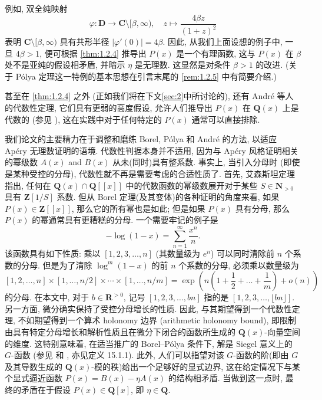 例如, 双全纯映射
\[ \varphi: \mathbf{D} \to \mathbf{C} \setminus [\beta, \infty), \quad z \mapsto \frac{4\beta z}{(1+z)^2} \]
表明 $\mathbf{C} \setminus [\beta, \infty)$ 具有共形半径 $|\varphi'(0)| = 4\beta$.
因此, 从我们上面设想的例子中, 一旦 $4\beta > 1$, 
便可根据 \autoref{thm:1.2.4} 推导出 $P(x)$ 是一个有理函数, 
这与 $P(x)$ 在 $\beta$ 处不是亚纯的假设相矛盾, 并暗示 $\eta$ 是无理数.
这显然是对条件 $\beta > 1$ 的改进.
(关于 P{\'o}lya 定理这一特例的基本思想在引言末尾的 \autoref{rem:1.2.5} 中有简要介绍.)

甚至在 \autoref{thm:1.2.4} 之外 (正如我们将在下文\autoref{sec:2}中所讨论的), 
还有 Andr{\'e} 等人的代数性定理, 它们具有更弱的高度假设, 
允许人们推导出 $P(x)$ 在 $\mathbf{Q}(x)$ 上是代数的 (参见 \cite{And04}\cite{And89}\cite{CDT21}), 
这在实践中对于任何特定的 $P(x)$ 通常可以直接排除.

我们论文的主要精力在于调整和磨练 Borel, P{\'o}lya 和 Andr{\'e} 的方法, 以适应 Ap{\'e}ry 无理数证明的语境.
代数性判据本身并不适用, 
因为与 Ap{\'e}ry 风格证明相关的幂级数 $A(x)$ and $B(x)$ 从未(同时)具有整系数.
事实上, 当引入分母时 (即使是某种受控的分母), 代数性就不再是需要考虑的合适性质了.
首先, 艾森斯坦定理 \cite[§11.4]{BG06} 指出, 
任何在 $\mathbf{Q}(x) \cap \mathbf{Q}[\![x]\!]$ 中的代数函数的幂级数展开对于某些 $S \in \mathbf{N}_{>0}$ 具有 $\mathbf{Z}[1/S]$ 系数.
但从 Borel 定理(及其变体)的各种证明的角度来看, 
如果 $P(x) \in \mathbf{Z}[\![x]\!]$, 那么它的所有幂也是如此; 
但是如果 $P(x)$ 具有分母, 那么 $P(x)$ 的幂通常具有更糟糕的分母.
一个需要牢记的例子是
\[ -\log(1-x) = \sum_{n=1}^{\infty} \frac{x^n}{n}. \]
该函数具有如下性质: 乘以 $[1, 2, 3, \dots, n]$ (其数量级为 $e^n$) 可以同时清除前 $n$ 个系数的分母.
但是为了清除 $\log^m(1-x)$ 的前 $n$ 个系数的分母, 必须乘以数量级为
\[ [1,2,\ldots,n]\times[1,\ldots,n/2]\times\cdots\times[1,\ldots,n/m]=\exp\left(n\left(1+\frac{1}{2}+\ldots+\frac{1}{m}\right)+o(n)\right) \]
的分母.
在本文中, 对于 $b \in \mathbf{R}^{>0}$, 记号 $[1, 2, 3, \dots, bn]$ 指的是 $[1, 2, 3, \dots, \lfloor bn \rfloor]$.
另一方面, 微分确实保持了受控分母增长的性质.
因此, 与其期望得到一个代数性定理, 不如期望得到一个算术 holonomy 边界 (arithmetic holonomy bound), 
即限制由具有特定分母增长和解析性质且在微分下闭合的函数所生成的 $\mathbf{Q}(x)$-向量空间的维度.
这特别意味着, 在适当推广的 Borel--P{\'o}lya 条件下, 
解是 Siegel 意义上的 $G$-函数 (参见 \cite{Zan14} 和 \cite[§VIII.1]{DGS94}, 亦见定义 15.1.1).
此外, 人们可以指望对该 $G$-函数的阶(即由 $G$ 及其导数生成的 $\mathbf{Q}(x)$-模的秩)给出一个足够好的显式边界, 
这在给定情况下与某个显式逼近函数 $P(x) = B(x) - \eta A(x)$ 的结构相矛盾.
当做到这一点时, 最终的矛盾在于假设 $P(x) \in \mathbf{Q}[x]$, 即 $\eta \in \mathbf{Q}$.

